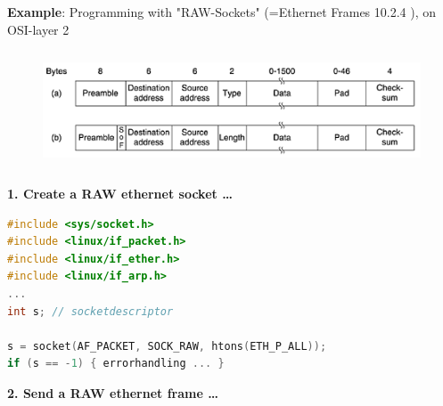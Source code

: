 \textbf{Example}: Programming with "RAW-Sockets" (=Ethernet Frames 10.2.4 ), on OSI-layer 2

    \begin{figure}[h]
    \centering
    \includegraphics[width=15cm, height=3.5cm]{Images/image57.png}
    \label{fig:Fig 154}
    \end{figure}

\textbf{ 1. Create a RAW ethernet socket {\dots}}

\begin{lstlisting}[style=mystyle, language=c]
#include <sys/socket.h>
#include <linux/if_packet.h>
#include <linux/if_ether.h>
#include <linux/if_arp.h>
...
int s; // socketdescriptor

s = socket(AF_PACKET, SOCK_RAW, htons(ETH_P_ALL));
if (s == -1) { errorhandling ... }
\end{lstlisting}


\textbf{2. Send a RAW ethernet frame {\dots}}

